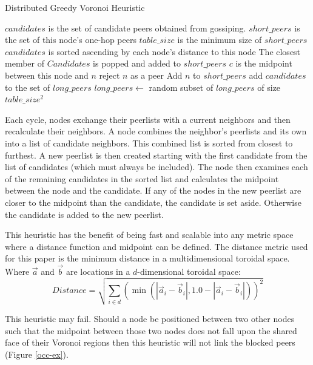 \documentclass{IEEEtran}
\begin{document}
\begin{algorithm}
\caption{Distributed Greedy Voronoi Heuristic}
\label{DGVH}
\begin{algorithmic}[1]  %
	\STATE $candidates$ is the set of candidate peers obtained from gossiping.
    \STATE $short\_peers$ is the set of this node's one-hop peers
    \STATE $table\_size$ is the minimum size of $short\_peers$
    \STATE $candidates$ is sorted  ascending by each node's distance to this node
    \STATE The closest member of $Candidates$ is popped and added to $short\_peers$
    	\STATE $c$ is the midpoint between this node and $n$
        	\STATE reject $n$ as a peer
        \ELSE
        	\STATE Add $n$ to $short\_peers$
        \ENDIF
    \ENDFOR
    		\STATE add $candidates$ to the set of $long\_peers$
        		\STATE $long\_peers \leftarrow$ random subset of $long\_peers$ of size $table\_size^2$
        	\ENDIF
    	\ENDFOR
    \ENDWHILE
\end{algorithmic}
\end{algorithm}


Each cycle, nodes exchange their peerlists with a current neighbors and then recalculate their neighbors.  
A node combines the neighbor's peerlists and its own into a list of candidate neighbors.
This combined list is sorted from closest to furthest.
A new peerlist is then created starting with the first candidate from the list of candidates (which must always be included).
The node then examines each of the remaining candidates in the sorted list and calculates the midpoint between the node and the candidate.
If any of the nodes in the new peerlist are closer to the midpoint than the candidate, the candidate is set aside.  Otherwise the candidate is added to the new peerlist.

This heuristic has the benefit of being fast and scalable into any metric space where a distance function and midpoint can be defined.
The distance metric used for this paper is the minimum distance in a multidimensional toroidal space.
Where $\vec{a}$ and $\vec{b}$ are locations in a $d$-dimensional toroidal space:
\[ Distance = \sqrt{\sum\limits_{i\in d} (\min(|\vec{a}_i-\vec{b}_i|, 1.0-|\vec{a}_i-\vec{b}_i|))^2}\]




This heuristic may fail.
Should a node be positioned between two other nodes such that the midpoint between those two nodes does not fall upon the shared face of their Voronoi regions then this heuristic will not link the blocked peers  (Figure \ref{occ-ex}). %
\end{document}
